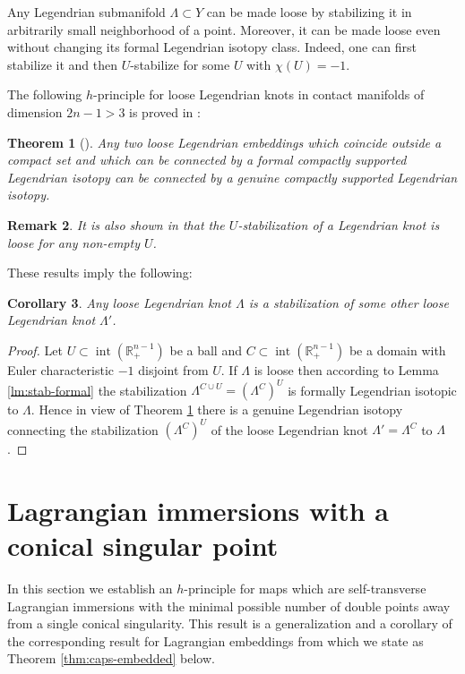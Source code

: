 \documentclass[reqno,11pt]{amsart}
\numberwithin{equation}{section}
\theoremstyle{my}
\theoremstyle{my}
\newtheorem{thm}{Theorem}[section]
\newtheorem{cor}[thm]{Corollary}
\theoremstyle{your}
\newtheorem{Remark}[thm]{Remark}
\newcommand{\R}{\mathbb{R}}
\newcommand{\Int}{\operatorname{int}}
\begin{document}
Any Legendrian submanifold $\Lambda\subset Y$ can be made loose by  stabilizing it in arbitrarily small neighborhood of a point.
Moreover, it can be made loose even without changing its formal Legendrian isotopy class. Indeed, one can first stabilize it
and then $U$-stabilize for some $U$ with $\chi(U)=-1$.
 

The following $h$-principle for loose Legendrian knots in contact manifolds of dimension $2n-1>3$ is proved in \cite{Mur}:  
\begin{thm}[\cite{Mur}]\label{prop:Murphy} Any two loose  Legendrian embeddings which coincide outside a compact set and which can be connected by a formal compactly supported Legendrian isotopy can be connected by a genuine compactly supported Legendrian isotopy.  
\end{thm}

\begin{Remark} 
It is also shown in \cite{Mur} that the $U$-stabilization of a Legendrian knot is loose for any non-empty $U$. 
\end{Remark}

These results imply the following:  
\begin{cor}\label{cor:loose-stab-loose} Any loose Legendrian knot $\Lambda$ is a stabilization of some other loose Legendrian knot $\Lambda'$.
\end{cor}
\begin{proof}   
Let $U \subset \Int(\R^{n-1}_+)$ be a ball and $C \subset \Int(\R^{n-1}_+)$ be a domain with Euler characteristic $-1$ disjoint from $U$. If $\Lambda$ is loose then according to Lemma \ref{lm:stab-formal} the stabilization $\Lambda^{C\cup U}=(\Lambda^C)^U$ is formally Legendrian isotopic to $\Lambda$. Hence in view of Theorem \ref{prop:Murphy} there is a genuine Legendrian isotopy connecting the stabilization $(\Lambda^{C})^{U}$ of the loose Legendrian knot $\Lambda'=\Lambda^C$ to $\Lambda$.
\end{proof}
   
 
\section{Lagrangian immersions with a conical singular point}\label{sec:conical}
In this section we establish an $h$-principle for maps which are self-transverse   Lagrangian immersions with the   minimal possible number of double points away from a single conical singularity. This result is a generalization and a corollary of the  corresponding result for Lagrangian embeddings from \cite{EliMur} which we state as  Theorem \ref{thm:caps-embedded} below.  
\end{document}
